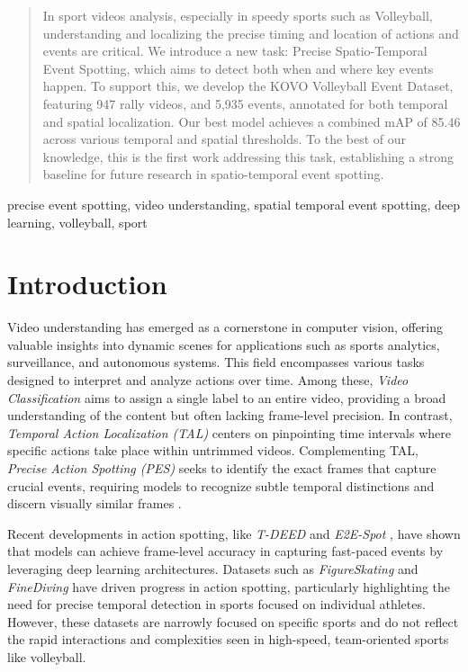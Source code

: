 \documentclass[conference]{IEEEtran}
\begin{document}
\begin{abstract}
    In sport videos analysis, especially in speedy sports such as Volleyball, understanding and localizing the precise timing and location of actions and events are critical. We introduce a new task: Precise Spatio-Temporal Event Spotting, which aims to detect both when and where key events happen. To support this, we develop the KOVO Volleyball Event Dataset, featuring 947 rally videos, and 5,935 events, annotated for both temporal and spatial localization. Our best model achieves a combined mAP of 85.46 across various temporal and spatial thresholds.
     To the best of our knowledge, this is the first work addressing this task, establishing a strong baseline for future research in spatio-temporal event spotting.
\end{abstract}

\begin{IEEEkeywords}
precise event spotting, video understanding, spatial temporal event spotting, deep learning, volleyball, sport
\end{IEEEkeywords}

\section{Introduction}

Video understanding has emerged as a cornerstone in computer vision, offering valuable insights into dynamic scenes for applications such as sports analytics, surveillance, and autonomous systems. This field encompasses various tasks designed to interpret and analyze actions over time. Among these, \textit{Video Classification} aims to assign a single label to an entire video, providing a broad understanding of the content but often lacking frame-level precision. 
In contrast, \textit{Temporal Action Localization (TAL)} centers on pinpointing time intervals where specific actions take place within untrimmed videos. Complementing TAL, \textit{Precise Action Spotting (PES)} seeks to identify the exact frames that capture crucial events, requiring models to recognize subtle temporal distinctions and discern visually similar frames \cite{spot22}.

Recent developments in action spotting, like \textit{T-DEED} \cite{tdeed23} and \textit{E2E-Spot} \cite{spot22}, have shown that models can achieve frame-level accuracy in capturing fast-paced events by leveraging deep learning architectures. Datasets such as \textit{FigureSkating} \cite{figureskating} and \textit{FineDiving} \cite{finediving} have driven progress in action spotting, particularly highlighting the need for precise temporal detection in sports focused on individual athletes. However, these datasets are narrowly focused on specific sports and do not reflect the rapid interactions and complexities seen in high-speed, team-oriented sports like volleyball.
\end{document}

